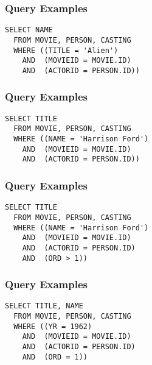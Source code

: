 \documentclass[dvipsnames]{beamer}
\theoremstyle{plain}
\begin{document}
\begin{frame}[fragile]
  \frametitle{Query Examples}

  \begin{example}
     \begin{lstlisting}
SELECT NAME
  FROM MOVIE, PERSON, CASTING
  WHERE ((TITLE = 'Alien')
    AND  (MOVIEID = MOVIE.ID)
    AND  (ACTORID = PERSON.ID))
      \end{lstlisting}
    \end{example}
\end{frame}

\begin{frame}[fragile]
  \frametitle{Query Examples}

  \begin{example}
    \begin{lstlisting}
SELECT TITLE
  FROM MOVIE, PERSON, CASTING
  WHERE ((NAME = 'Harrison Ford')
    AND  (MOVIEID = MOVIE.ID)
    AND  (ACTORID = PERSON.ID))
    \end{lstlisting}
  \end{example}
\end{frame}

\begin{frame}[fragile]
  \frametitle{Query Examples}

  \begin{example}
    \begin{lstlisting}
SELECT TITLE
  FROM MOVIE, PERSON, CASTING
  WHERE ((NAME = 'Harrison Ford')
    AND  (MOVIEID = MOVIE.ID)
    AND  (ACTORID = PERSON.ID)
    AND  (ORD > 1))
    \end{lstlisting}
  \end{example}
\end{frame}

\begin{frame}[fragile]
  \frametitle{Query Examples}

  \begin{example}
    \begin{lstlisting}
SELECT TITLE, NAME
  FROM MOVIE, PERSON, CASTING
  WHERE ((YR = 1962)
    AND  (MOVIEID = MOVIE.ID)
    AND  (ACTORID = PERSON.ID)
    AND  (ORD = 1))
    \end{lstlisting}
  \end{example}
\end{frame}
\end{document}
